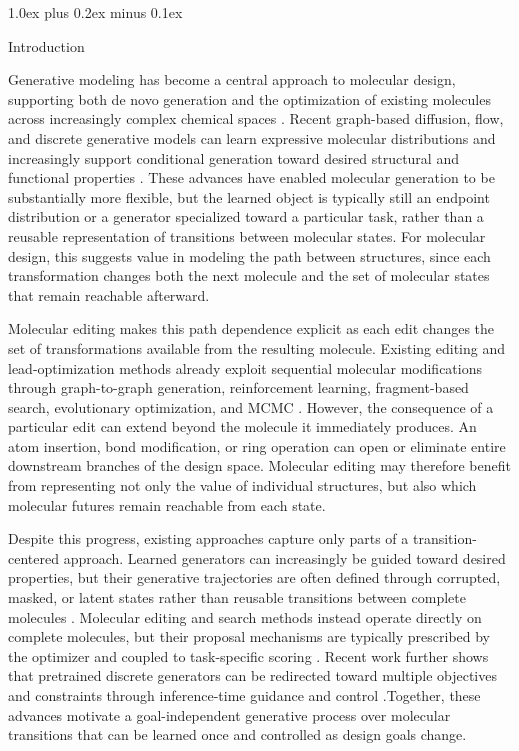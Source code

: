 \documentclass{article}
\makeatletter
\theoremstyle{definition}
\theoremstyle{remark}
\def\section{\@startsection{section}{1}{\z@}{-1.4ex plus -0.4ex minus -.2ex}%
  {1.0ex plus 0.2ex minus 0.1ex}{\large\sc\raggedright}}
\makeatother
\begin{document}
\section{Introduction}
\label{sec:intro}

Generative modeling has become a central approach to molecular design, supporting both de novo generation and the optimization of existing molecules across increasingly complex chemical spaces \citep{gomezbombarelli2018chemvae,jin2018jtvae,vignac2023digress,lee2025genmol}. Recent graph-based diffusion, flow, and discrete generative models can learn expressive molecular distributions and increasingly support conditional generation toward desired structural and functional properties \citep{vignac2023digress,campbell2024multiflow,lee2025genmol}. These advances have enabled molecular generation to be substantially more flexible, but the learned object is typically still  an  endpoint distribution or a generator specialized toward a particular task, rather than a reusable representation of transitions between molecular states. For molecular design, this suggests value in modeling the path between structures, since each transformation changes both the next molecule and the set of molecular states that remain reachable afterward.

Molecular editing makes this path dependence explicit as each edit changes the set of transformations available from the resulting molecule. Existing editing and lead-optimization methods already exploit sequential molecular modifications through graph-to-graph generation, reinforcement learning, fragment-based search, evolutionary optimization, and MCMC \citep{jin2019vjtnn,zhou2019moldqn,jensen2019graphga,xie2021mars,fu2021mimosa}. However, the consequence of a particular edit can extend beyond the molecule it immediately produces. An atom insertion, bond modification, or ring operation can open or eliminate entire downstream branches of the design space. Molecular editing may therefore benefit from representing not only the value of individual structures, but also which molecular futures remain reachable from each state.

Despite this progress, existing approaches capture only parts of a transition-centered approach. Learned generators can increasingly be guided toward desired properties, but their generative trajectories are often defined through corrupted, masked, or latent states rather than reusable transitions between complete molecules \citep{vignac2023digress,campbell2024multiflow,lee2025genmol}. Molecular editing and search methods instead operate directly on complete molecules, but their proposal mechanisms are typically prescribed by the optimizer and coupled to task-specific scoring \citep{jensen2019graphga,zhou2019moldqn,xie2021mars}. Recent work further shows that pretrained discrete generators can be redirected toward multiple objectives and constraints through inference-time guidance and control \citep{chen2025areuredi,pcomole2026}.Together, these advances motivate a goal-independent generative process over molecular transitions that can be learned once and controlled as design goals change.
\end{document}
